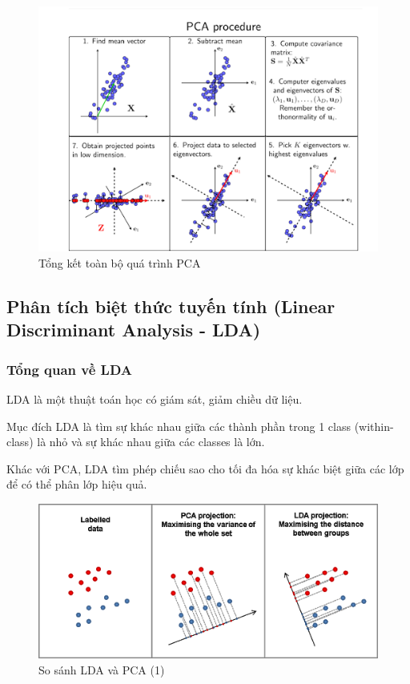 \documentclass[a4paper, 12pt]{article}
\begin{document}
\begin{figure}[H]
    \begin{center}
        \includegraphics[scale=0.7]{img/PCA-total}
        \caption{Tổng kết toàn bộ quá trình PCA}
    \end{center}
\end{figure}

\subsection{Phân tích biệt thức tuyến tính (Linear Discriminant Analysis - LDA)}
\subsubsection{Tổng quan về LDA}

LDA là một thuật toán học có giám sát, giảm chiều dữ liệu.

Mục đích LDA là tìm sự khác nhau giữa các thành phần trong 1 class (within-class) là nhỏ và sự khác nhau giữa các classes là lớn.

Khác với PCA, LDA tìm phép chiếu sao cho tối đa hóa sự khác biệt giữa các lớp để có thể phân lớp hiệu quả.

\begin{figure}[H]
    \begin{center}
        \includegraphics[scale=0.7]{img/LDA-PCA-cmp}
        \caption{So sánh LDA và PCA (1)}
    \end{center}
\end{figure}
\end{document}
